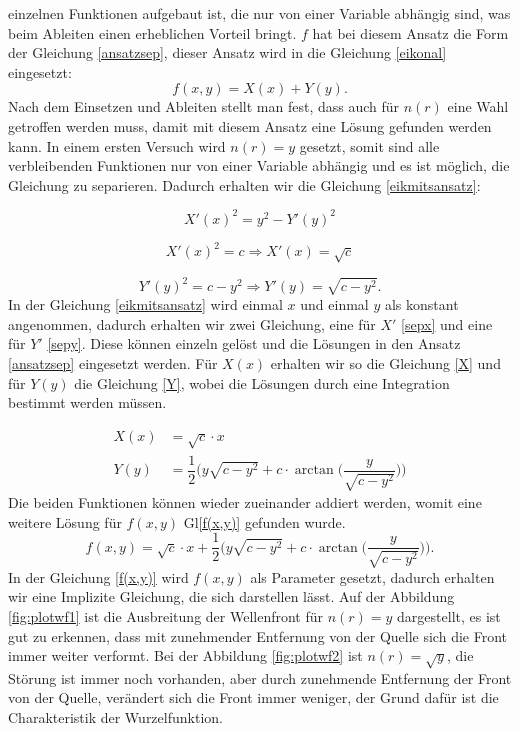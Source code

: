 \begin{refsection}
einzelnen Funktionen aufgebaut ist, die nur von einer Variable abhängig
sind, was beim Ableiten einen erheblichen Vorteil bringt. $f$ hat bei
diesem Ansatz die Form der Gleichung \eqref{ansatzsep}, dieser Ansatz
wird in die Gleichung \eqref{eikonal} eingesetzt:
\begin{equation}\label{ansatzsep}
f(x,y)=X(x) + Y(y).
\end{equation}
Nach dem Einsetzen und Ableiten stellt man fest, dass auch für $n(r)$ eine Wahl getroffen werden muss, damit mit diesem Ansatz eine Lösung gefunden werden kann. In einem ersten Versuch wird $n(r)=y$ gesetzt, somit sind alle verbleibenden Funktionen nur von einer Variable abhängig und es ist möglich, die Gleichung zu separieren. Dadurch erhalten wir die Gleichung \eqref{eikmitsansatz}:

\begin{equation}\label{eikmitsansatz}
X'(x)^{2}=y^{2}-Y'(y)^{2}
\end{equation}

\begin{equation}\label{sepx}
X'(x)^{2}=c \Rightarrow X'(x)=\sqrt{c}
\end{equation}

\begin{equation}\label{sepy}
Y'(y)^{2}=c-y^{2}  \Rightarrow Y'(y)=\sqrt{c-y^{2}}.
\end{equation}
In der Gleichung \eqref{eikmitsansatz} wird einmal $x$ und einmal $y$ als konstant angenommen, dadurch erhalten wir zwei Gleichung, eine für $X'$ \eqref{sepx} und eine für $Y'$ \eqref{sepy}. Diese können einzeln gelöst und die Lösungen in den Ansatz \eqref{ansatzsep} eingesetzt werden. Für $X(x)$ erhalten wir so die Gleichung \eqref{X} und für $Y(y)$ die Gleichung \eqref{Y}, wobei die Lösungen durch eine Integration bestimmt werden müssen.

\begin{align}
\label{X}
X(x)&=\sqrt{c}\cdot x
\\
\label{Y}
Y(y)&=\dfrac{1}{2}\biggl(y \sqrt{c-y^{2}}+c \cdot \arctan\biggl(  \dfrac{y}{\sqrt{c-y^{2}}}\biggr) \biggr) 
\end{align}
Die beiden Funktionen können wieder zueinander addiert werden, womit eine weitere Lösung für $f(x,y)$  Gl\eqref{f(x,y)} gefunden wurde.
\begin{equation}\label{f(x,y)}
f(x,y)= \sqrt{c}\cdot x + \dfrac{1}{2}\biggl(y \sqrt{c-y^{2}}+c \cdot \arctan\biggl(  \dfrac{y}{\sqrt{c-y^{2}}}\biggr) \biggr) .
\end{equation}
In der Gleichung \eqref{f(x,y)} wird $f(x,y)$ als Parameter gesetzt, dadurch erhalten wir eine Implizite Gleichung, die sich darstellen lässt. 
Auf der Abbildung \ref{fig:plotwf1} ist die Ausbreitung der Wellenfront für $n(r)=y$ dargestellt, es ist gut zu erkennen, dass mit zunehmender Entfernung von der Quelle sich die Front immer weiter verformt. Bei der Abbildung \ref{fig:plotwf2} ist $n(r)= \sqrt{y}$, die Störung ist immer noch vorhanden, aber durch zunehmende Entfernung der Front von der Quelle, verändert sich die Front immer weniger, der Grund dafür ist die Charakteristik der Wurzelfunktion.


\end{refsection}
